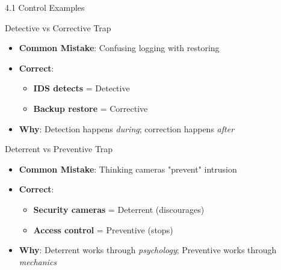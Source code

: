 \documentclass{beamer}
\begin{document}
	\begin{frame}{4.1 Control Examples}
		\begin{block}{Detective vs Corrective Trap}
			\begin{itemize}
				\item \textbf{Common Mistake}: Confusing logging with restoring
				\item \textbf{Correct}: 
				\begin{itemize}
					\item \textbf{IDS detects} = Detective
					\item \textbf{Backup restore} = Corrective
				\end{itemize}
				\item \textbf{Why}: Detection happens \textit{during}; correction happens \textit{after}
			\end{itemize}
		\end{block}
		
		\begin{block}{Deterrent vs Preventive Trap}
			\begin{itemize}
				\item \textbf{Common Mistake}: Thinking cameras "prevent" intrusion
				\item \textbf{Correct}: 
				\begin{itemize}
					\item \textbf{Security cameras} = Deterrent (discourages)
					\item \textbf{Access control} = Preventive (stops)
				\end{itemize}
				\item \textbf{Why}: Deterrent works through \textit{psychology}; Preventive works through \textit{mechanics}
			\end{itemize}
		\end{block}
	\end{frame}
	
\end{document}
